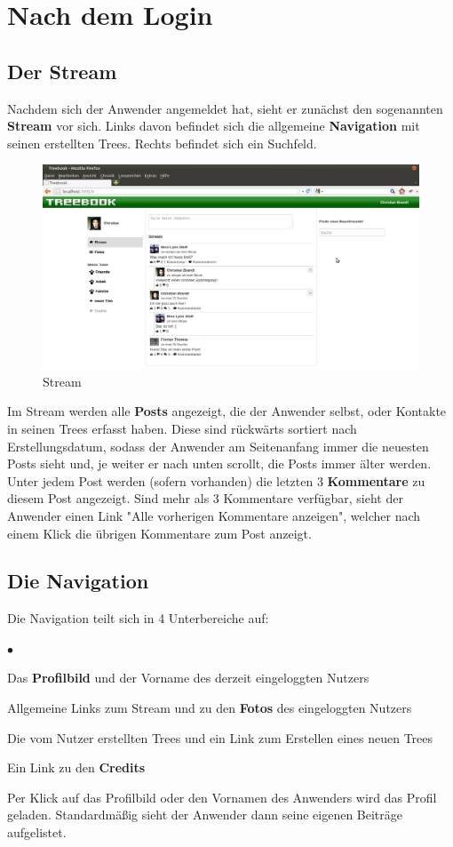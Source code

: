 \documentclass[10pt,a4paper]{book}
\makeatletter
\def\ScaleIfNeeded{%
\ifdim\Gin@nat@width>\linewidth
\linewidth
\else
\Gin@nat@width
\fi
}
\makeatother
\begin{document}
\section{Nach dem Login}
\subsection{Der Stream}
Nachdem sich der Anwender angemeldet hat, sieht er zunächst den sogenannten \textbf{Stream} vor sich. Links davon befindet sich die allgemeine \textbf{Navigation} mit seinen erstellten Trees. Rechts befindet sich ein Suchfeld.
\begin{figure}[htbp]
\centering
\includegraphics[width=\ScaleIfNeeded]{Pictures/screen_stream.png}%
\caption{Stream}%
\end{figure}
Im Stream werden alle \textbf{Posts} angezeigt, die der Anwender selbst, oder Kontakte in seinen Trees erfasst haben. Diese sind rückwärts sortiert nach Erstellungsdatum, sodass der Anwender am Seitenanfang immer die neuesten Posts sieht und, je weiter er nach unten scrollt, die Posts immer älter werden.
Unter jedem Post werden (sofern vorhanden) die letzten 3 \textbf{Kommentare} zu diesem Post angezeigt. Sind mehr als 3 Kommentare verfügbar, sieht der Anwender einen Link "Alle vorherigen Kommentare anzeigen", welcher nach einem Klick die übrigen Kommentare zum Post anzeigt.
\subsection{Die Navigation}
Die Navigation teilt sich in 4 Unterbereiche auf:
\begin{list}{$\bullet$}{}
\item Das \textbf{Profilbild} und der Vorname des derzeit eingeloggten Nutzers
\item Allgemeine Links zum Stream und zu den \textbf{Fotos} des eingeloggten Nutzers
\item Die vom Nutzer erstellten Trees und ein Link zum Erstellen eines neuen Trees
\item Ein Link zu den \textbf{Credits}
\end{list}
Per Klick auf das Profilbild oder den Vornamen des Anwenders wird das Profil geladen. Standardmäßig sieht der Anwender dann seine eigenen Beiträge aufgelistet.
\end{document}

